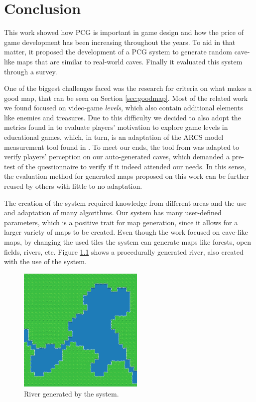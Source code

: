 \chapter{Conclusion}
\label{chapter:conclusion}

This work showed how PCG is important in game design and how the price of game development has been increasing throughout the years. To aid in that matter, it proposed the development of a PCG system to generate random cave-like maps that are similar to real-world caves. Finally it evaluated this system through a survey.

One of the biggest challenges faced was the research for criteria on what makes a good map, that can be seen on Section \ref{sec:goodmap}. Most of the related work we found focused on video-game \emph{levels}, which also contain additional elements like enemies and treasures. Due to this difficulty we decided to also adopt the metrics found in \textcite{carvalho:2016} to evaluate players' motivation to explore game levels in educational games, which, in turn, is an adaptation of the ARCS model measurement tool found in \textcite{keller:1987}. To meet our ends, the tool from \textcite{carvalho:2016} was adapted to verify players' perception on our auto-generated caves, which demanded a pre-test of the questionnaire to verify if it indeed attended our needs. In this sense, the evaluation method for generated maps proposed on this work can be further reused by others with little to no adaptation.

The creation of the system required knowledge from different areas and the use and adaptation of many algorithms. Our system has many user-defined parameters, which is a positive trait for map generation, since it allows for a larger variety of maps to be created. Even though the work focused on cave-like maps, by changing the used tiles the system can generate maps like forests, open fields, rivers, etc. Figure \ref{fig:river} shows a procedurally generated river, also created with the use of the system.

\begin{figure}[h]
    \caption{River generated by the system.}
    \centerline{\includegraphics[width=6cm]{images/river.png}}
    \label{fig:river}
\end{figure}

